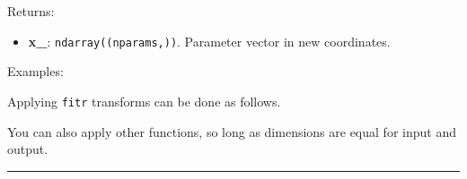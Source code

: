 Returns:

\begin{itemize}
\tightlist
\item
  \textbf{x\_}: \texttt{ndarray((nparams,))}. Parameter vector in new
  coordinates.
\end{itemize}

Examples:

Applying \texttt{fitr} transforms can be done as follows.

\begin{Shaded}
\begin{Highlighting}[]

\OperatorTok{=}\NormalTok{, }\OperatorTok{=}\NormalTok{)}
\OperatorTok{=}
\end{Highlighting}
\end{Shaded}

You can also apply other functions, so long as dimensions are equal for
input and output.

\begin{Shaded}
\begin{Highlighting}[]

\OperatorTok{=}\NormalTok{, }\OperatorTok{=}\NormalTok{)}
\OperatorTok{=}
\end{Highlighting}
\end{Shaded}

\begin{center}\rule{0.5\linewidth}{\linethickness}\end{center}
